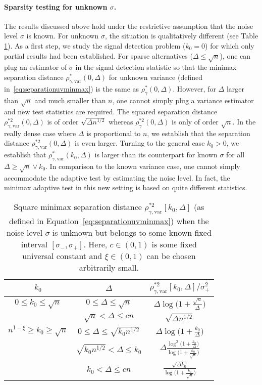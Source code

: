 \documentclass[twoside,11pt]{article}
\newcommand{\<}{\langle}
\renewcommand{\>}{\rangle}
\begin{document}
\paragraph{Sparsity testing for unknown $\sigma$.} The results discussed above hold under the restrictive assumption that the noise level $\sigma$ is known. For unknown $\sigma$, the situation is qualitatively different (see Table \ref{fig:UV}). As a first step, we study the signal detection problem ($k_0=0$) for which only partial results had been established. For sparse alternatives ($\Delta\leq \sqrt{n}$), one can plug an estimator of $\sigma$ in the signal detection statistic so that the minimax separation distance $\rho^*_{\gamma,\mathrm{var}}(0,\Delta)$ for unknown variance (defined in~\eqref{eq:separationuvminmax}) is the same as $\rho^*_{\gamma}(0,\Delta)$. However, for $\Delta$ larger than $\sqrt{n}$ and much smaller than $n$, one cannot simply plug a variance estimator and new test statistics are required. The squared separation distance $\rho^{*2}_{\gamma,\mathrm{var}}(0,\Delta)$ is of order $\sqrt{\Delta n^{1/2}}$ whereas $\rho^{*2}_{\gamma}(0,\Delta)$ is only of order $\sqrt{n}$. In the really dense case where $\Delta$ is proportional to $n$, we establish that the separation distance $\rho^{*2}_{\gamma,\mathrm{var}}(0,\Delta)$ is even larger. Turning to the general case $k_0>0$, we establish that $\rho^*_{\gamma,\mathrm{var}}(k_0,\Delta)$ is larger than its counterpart for known $\sigma$ for all $\Delta\geq \sqrt{n}\vee k_0$. In comparison to the known variance case, one cannot simply accommodate the adaptive test by estimating the noise level. In fact, the minimax adaptive test in this new setting is based on quite different statistics. 


\begin{table}
\caption{Square minimax separation distance $\rho_{\gamma,\mathrm{var}}^{*2}[k_0,\Delta]$ (as defined in Equation~\eqref{eq:separationuvminmax})  when the noise level $\sigma$ is unknown but belongs to some known fixed interval  $[\sigma_-,\sigma_+]$. Here, $c\in (0,1)$ is some fixed universal constant and $\xi\in (0,1)$ can be chosen arbitrarily small.}\label{fig:UV}
 \begin{center} 
 \begin{tabular}{c|c|c}
$k_0$ & $\Delta$ &  $\rho_{\gamma, \mathrm{var}}^{*2}[k_0,\Delta]/\sigma_+^2$\\\hline \hline
$0\leq k_0 \leq \sqrt{n}$ & $0\leq \Delta \leq \sqrt{n}$ & $\Delta \log\Big(1+\frac{\sqrt{n}}{\Delta}\Big)$  \\ 
 & $\sqrt{n}< \Delta \leq cn$ & $\sqrt{\Delta n^{1/2}}$ \\
\hline
$n^{1-\xi} \geq k_0 \geq \sqrt{n}$ & $0\leq \Delta \leq \sqrt{k_0n^{1/2}}$ &  $\Delta \log\Big(1+\frac{k_0}{\Delta}\Big)$\\
 & $\sqrt{k_0n^{1/2}}< \Delta \leq k_0$  & $ \Delta \tfrac{\log^2\big(1+\frac{k_0}{\Delta}\big)}{\log\big(1+\frac{k_0}{\sqrt{n}}\big)}$\\
&  $ k_0 < \Delta \leq cn$ &  $\frac{\sqrt{\Delta k_0}}{\log\Big(1+\frac{k_0}{\sqrt{n}}\Big)}$  
 \end{tabular}
 \end{center}
\end{table}
\end{document}
